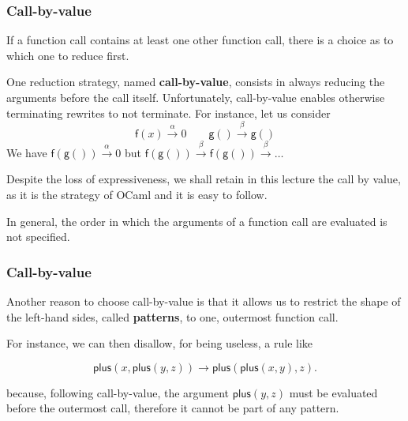 \documentclass[compress,dvipdfmx]{beamer}
\newcommand{\OCaml}{\textsf{OCaml}\xspace}
\newcommand\fun[1]{\textsf{#1}}
\begin{document}
\begin{frame}
  \frametitle{Call-by-value}

  If a function call contains at least one other function call, there
  is a choice as to which one to reduce first.

  \bigskip

  One reduction strategy, named \textbf{call-by-value}, consists in
  always reducing the arguments before the call itself. Unfortunately,
  call-by-value enables otherwise terminating rewrites to not
  terminate. For instance, let us consider
  \begin{equation*}
    \fun{f}(x) \xrightarrow{\alpha} 0\qquad
    \fun{g}() \xrightarrow{\beta} \fun{g}()
  \end{equation*}
  We have \(\fun{f}(\fun{g}()) \xrightarrow{\alpha} 0\) but
  \(\fun{f}(\fun{g}()) \xrightarrow{\beta} \fun{f}(\fun{g}())
  \xrightarrow{\beta} \dots\)

  \bigskip

  Despite the loss of expressiveness, we shall retain in this lecture
  the call by value, as it is the strategy of \OCaml and it is easy to
  follow.

  \bigskip

  In general, the order in which the arguments of a function call are
  evaluated is not specified.

\end{frame}


\begin{frame}
  \frametitle{Call-by-value}

  Another reason to choose call-by-value is that it allows us to
  restrict the shape of the left\hyp{}hand sides, called
  \textbf{patterns}, to one, outermost function call.

  \bigskip

  For instance, we can then disallow, for being useless, a
  rule like

  \begin{equation*}
    \fun{plus}(x,\fun{plus}(y,z)) \rightarrow
    \fun{plus}(\fun{plus}(x,y),z).
  \end{equation*}

  \noindent because, following call\hyp{}by\hyp{}value, the argument
  \(\fun{plus}(y,z)\) must be evaluated before the outermost call,
  therefore it cannot be part of any pattern.

\end{frame}
\end{document}
